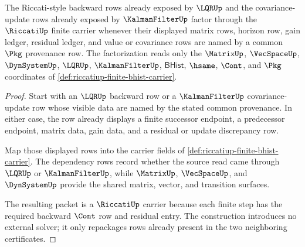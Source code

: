 \begin{theorem}
\label{thm:riccatiup-lqr-kalman-anchor-surface}
The Riccati-style backward rows already exposed by $\LQRUp$ and the covariance-update rows already exposed by $\KalmanFilterUp$ factor through the $\RiccatiUp$ finite carrier whenever their displayed matrix rows, horizon row, gain ledger, residual ledger, and value or covariance rows are named by a common $\Pkg$ provenance row. The factorization reads only the $\MatrixUp$, $\VecSpaceUp$, $\DynSystemUp$, $\LQRUp$, $\KalmanFilterUp$, $\mathsf{BHist}$, $\hsame$, $\Cont$, and $\Pkg$ coordinates of \autoref{def:riccatiup-finite-bhist-carrier}.
\end{theorem}
\begin{proof}
Start with an $\LQRUp$ backward row or a $\KalmanFilterUp$ covariance-update row whose visible data are named by the stated common provenance. In either case, the row already displays a finite successor endpoint, a predecessor endpoint, matrix data, gain data, and a residual or update discrepancy row.

Map those displayed rows into the carrier fields of \autoref{def:riccatiup-finite-bhist-carrier}. The dependency rows record whether the source read came through $\LQRUp$ or $\KalmanFilterUp$, while $\MatrixUp$, $\VecSpaceUp$, and $\DynSystemUp$ provide the shared matrix, vector, and transition surfaces.

The resulting packet is a $\RiccatiUp$ carrier because each finite step has the required backward $\Cont$ row and residual entry. The construction introduces no external solver; it only repackages rows already present in the two neighboring certificates.
\end{proof}

